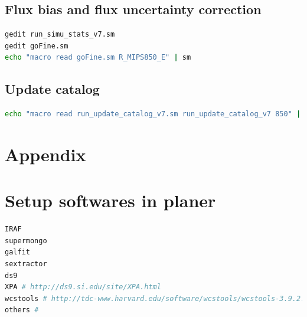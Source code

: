 \documentclass[11pt,a4paper]{article}
\begin{document}
\subsection{Flux bias and flux uncertainty correction}
\label{Band850_dfcorr}

\begin{lstlisting}[language=bash]
gedit run_simu_stats_v7.sm
gedit goFine.sm
echo "macro read goFine.sm R_MIPS850_E" | sm
\end{lstlisting}


\subsection{Update catalog}

\begin{lstlisting}[language=bash]
echo "macro read run_update_catalog_v7.sm run_update_catalog_v7 850" | sm
\end{lstlisting}



\clearpage

\appendix
\section{Appendix}
\label{Appendix}


\clearpage


\section{Setup softwares in planer}
\label{Appendix_Software_Dependencies}

\begin{lstlisting}[language=bash]
IRAF
supermongo
galfit
sextractor
ds9
XPA # http://ds9.si.edu/site/XPA.html
wcstools # http://tdc-www.harvard.edu/software/wcstools/wcstools-3.9.2.tar.gz
others # 
\end{lstlisting}

\end{document}
